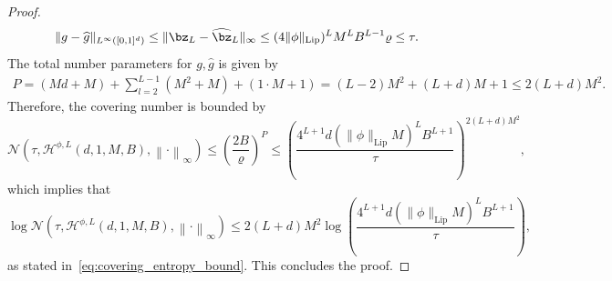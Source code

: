 \documentclass[11pt]{article}
\begin{document}
\begin{proof}
    \begin{equation*}
        \|g - \widehat{g}\|_{L^{\infty}([0,1]^d)} \leq \|\bz_L - \widehat{\bz}_L\|_{\infty} \leq (4\|\phi\|_{\mathrm{Lip}} )^{L} M^{L} B^{L-1} \varrho \leq \tau. 
    \end{equation*}
    The total number parameters for $g, \widehat{g}$ is given by 
    \begin{equation*}
        \begin{aligned}
            P  = (M d + M) + \sum_{l=2}^{L-1} (M^2 + M) + (1 \cdot M + 1) = (L - 2) M^2 + (L + d ) M + 1 \leq 2 (L + d) M^2.
        \end{aligned}
    \end{equation*}
    Therefore, the covering number is bounded by 
    \begin{equation*}
        \mathcal{N}(\tau, \mathcal{H}^{\phi,L}(d, 1, M, B), \left\|\cdot\right\|_\infty) \leq \left( \frac{2B}{\varrho}\right)^{P} \leq \left( \frac{4^{L+1} d ( \|\phi\|_{\mathrm{Lip}} M)^{L} B^{L+1}}{\tau}\right)^{2(L+d) M^2},
    \end{equation*}
    which implies that 
    \begin{equation*}
        \log \mathcal{N}(\tau, \mathcal{H}^{\phi,L}(d, 1, M, B), \left\|\cdot\right\|_\infty)  \leq 2 (L+d) M^2 \log \left( \frac{4^{L+1}d( \|\phi\|_{\mathrm{Lip}} M)^{L} B^{L+1}}{\tau}\right),
    \end{equation*}
    as stated in~\eqref{eq:covering_entropy_bound}. This concludes the proof.
\end{proof}
\end{document}
